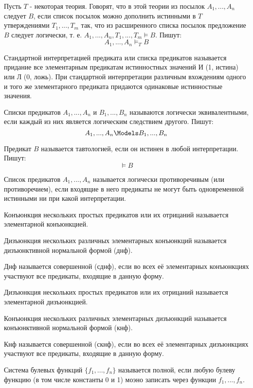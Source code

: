 \opred

Пусть $T$ - некоторая теория.
Говорят, что в этой теории из посылок $A_1, ..., A_n$ следует $B$, если список посылок можно дополнить истинными в $T$ утверждениями $T_1, ..., T_m$ так, что из расширенного списка посылок предложение $B$ следует логически, т. е. $A_1, ..., A_n, T_1, ..., T_m \models B$.
Пишут: $$A_1, ..., A_n \models_T B$$

\opred
Стандартной интерпретацией предиката или списка предикатов называется придание все элементарным предикатам истинностных значений И (1, истина) или Л (0, ложь).
При стандартной интерпретации различным вхождениям одного и того же элементарного предиката придаются одинаковые истинностные значения.

\opred
Списки предикатов $A_1, ..., A_n$ и $B_1, ..., B_n$ называются логически эквивалентными, если каждый из них является логическим следствием другого.
Пишут:
$$A_1, ..., A_n \Models B_1, ..., B_n$$

\opred
Предикат $B$ называется тавтологией, если он истинен в любой интерпретации.
Пишут:
$$\models B$$

\opred

Список предикатов $A_1, ..., A_n$ называется логически противоречивым (или противоречием), если входящие в него предикаты не могут быть одновременной истинными ни при какой интерпретации.

\opred

Конъюнкция нескольких простых предикатов или их отрицаний называется элементарной конъюнкцией.

\opred

Дизъюнкция нескольких различных элементарных конъюнкций называется дизъюнктивной нормальной формой (днф).

\opred

Днф называется совершенной (сднф), если во всех её элементарных конъюнкциях участвуют все предикаты, входящие в данную форму.

\opred

Дизъюнкция нескольких простых предикатов или их отрицаний называется элементарной дизъюнкцией.

\opred

Конъюнкция нескольких различных элементарных дизъюнкций называется конъюнктивной нормальной формой (кнф).

\opred

Кнф называется совершенной (скнф), если во всех её элементарных дизъюнкциях участвуют все предикаты, входящие в данную форму.

\opred

Система булевых функций $\{f_1,...,f_n\}$ называется полной, если любую булеву функцию (в том числе константы 0 и 1) моэно записать через функции $f_1,...,f_n$.




